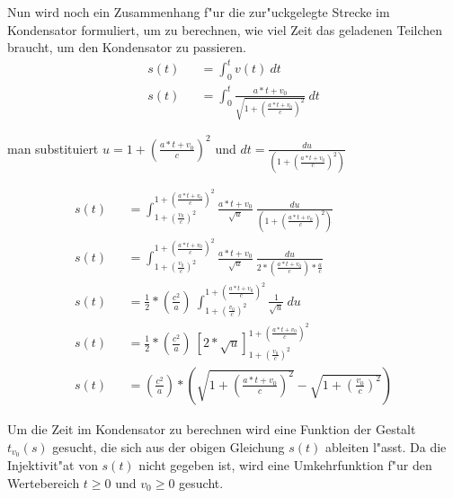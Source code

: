 \documentclass[14pt, a4paper]{report}
\begin{document}
\newpage
Nun wird noch ein Zusammenhang f"ur die zur"uckgelegte Strecke im Kondensator formuliert,
um zu berechnen, wie viel Zeit das geladenen Teilchen braucht, um den Kondensator zu
passieren.
\begin{eqnarray}
s(t) && = \int_0^t v(t) ~dt \\
s(t) && = \int_0^t \frac{a * t + v_0}{\sqrt{1 + \left(\frac{a * t + v_0}{c}\right)^2}} ~ dt
\end{eqnarray}

man substituiert $u = 1 + \left(\frac{a * t + v_0}{c}\right)^2$ und 
$dt = \frac{du}{\left(1 + \left(\frac{a * t + v_0}{c}\right)^2\right)\dot{}}$

\begin{eqnarray}
s(t) && = \int_{1 + \left(\frac{v_0}{c}\right)^2}^{1 + \left(\frac{a*t + v_0}{c}\right)^2}  \frac{a * t + v_0}{\sqrt{u}} ~ \frac{du}{ \left({1 + \left(\frac{a * t + v_0}{c}\right)^2}\right)\dot{}}\\
s(t) && =  \int_{1 + \left(\frac{v_0}{c}\right)^2}^{1 + \left(\frac{a*t + v_0}{c}\right)^2}  \frac{a * t + v_0}{\sqrt{u}} ~ \frac{du}{2*\left(\frac{a * t + v_0}{c}\right)*\frac{a}{c}}\\
s(t) && = \frac{1}{2}*\left(\frac{c^2}{a}\right) ~ \int_{1 + \left(\frac{v_0}{c}\right)^2}^{1 + \left(\frac{a*t + v_0}{c}\right)^2} \frac{1}{\sqrt{u}} ~ du \\
s(t) && = \frac{1}{2}*\left(\frac{c^2}{a}\right)~\left[2*\sqrt{u}\right]_{1 + \left(\frac{v_0}{c}\right)^2}^{1 + \left(\frac{a*t + v_0}{c}\right)^2} \\
s(t) && = \left(\frac{c^2}{a}\right) * \left(\sqrt{1 + \left(\frac{a*t + v_0}{c}\right)^2} - \sqrt{1 + \left(\frac{v_0}{c}\right)^2}\right)
\end{eqnarray}

Um die Zeit im Kondensator zu berechnen wird eine Funktion der Gestalt $t_{v_0}(s)$
gesucht, die sich aus der obigen Gleichung $s(t)$ ableiten l"asst. Da die Injektivit"at\footnotemark
{} von $s(t)$ nicht gegeben ist, wird eine 
Umkehrfunktion f"ur den Wertebereich $t \ge 0$ und $v_0 \ge 0$ gesucht.
\end{document}

